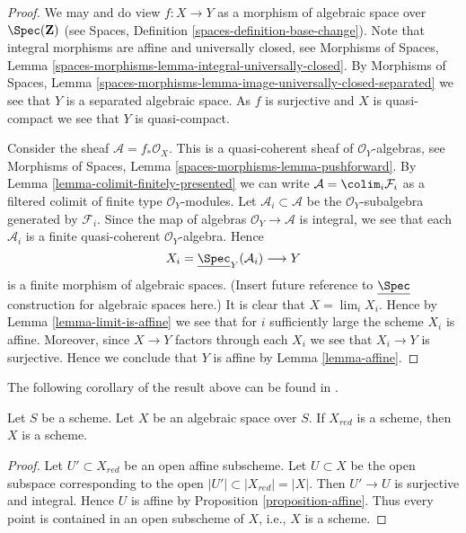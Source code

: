 \begin{proof}
We may and do view $f : X \to Y$ as a morphism of algebraic space over
$\Spec(\mathbf{Z})$ (see
Spaces, Definition \ref{spaces-definition-base-change}).
Note that integral morphisms are affine and universally closed, see
Morphisms of Spaces, Lemma
\ref{spaces-morphisms-lemma-integral-universally-closed}.
By Morphisms of Spaces, Lemma
\ref{spaces-morphisms-lemma-image-universally-closed-separated}
we see that $Y$ is a separated algebraic space.
As $f$ is surjective and $X$ is quasi-compact we see that $Y$ is
quasi-compact.

\medskip\noindent
Consider the sheaf $\mathcal{A} = f_*\mathcal{O}_X$.
This is a quasi-coherent sheaf of $\mathcal{O}_Y$-algebras, see
Morphisms of Spaces, Lemma \ref{spaces-morphisms-lemma-pushforward}.
By Lemma \ref{lemma-colimit-finitely-presented}
we can write $\mathcal{A} = \colim_i \mathcal{F}_i$ as a filtered
colimit of finite type $\mathcal{O}_Y$-modules. Let
$\mathcal{A}_i \subset \mathcal{A}$ be the $\mathcal{O}_Y$-subalgebra
generated by $\mathcal{F}_i$. Since the map of algebras
$\mathcal{O}_Y \to \mathcal{A}$ is integral, we see that each $\mathcal{A}_i$
is a finite quasi-coherent $\mathcal{O}_Y$-algebra. Hence
$$
X_i = \underline{\Spec}_Y(\mathcal{A}_i) \longrightarrow Y
$$
is a finite morphism of algebraic spaces. (Insert future reference to
$\underline{\Spec}$ construction for algebraic spaces here.) It is clear
that $X = \lim_i X_i$. Hence by
Lemma \ref{lemma-limit-is-affine}
we see that for $i$ sufficiently large the scheme $X_i$ is affine.
Moreover, since $X \to Y$ factors through each $X_i$ we see that
$X_i \to Y$ is surjective. Hence we conclude that $Y$ is affine by
Lemma \ref{lemma-affine}.
\end{proof}

\noindent
The following corollary of the result above can be found in
\cite{CLO}.

\begin{lemma}
\label{lemma-reduction-scheme}
Let $S$ be a scheme. Let $X$ be an algebraic space over $S$.
If $X_{red}$ is a scheme, then $X$ is a scheme.
\end{lemma}

\begin{proof}
Let $U' \subset X_{red}$ be an open affine subscheme.
Let $U \subset X$ be the open subspace corresponding to the open
$|U'| \subset |X_{red}| = |X|$. Then $U' \to U$ is surjective and
integral. Hence $U$ is affine by
Proposition \ref{proposition-affine}.
Thus every point is contained in an open subscheme of $X$, i.e.,
$X$ is a scheme.
\end{proof}

